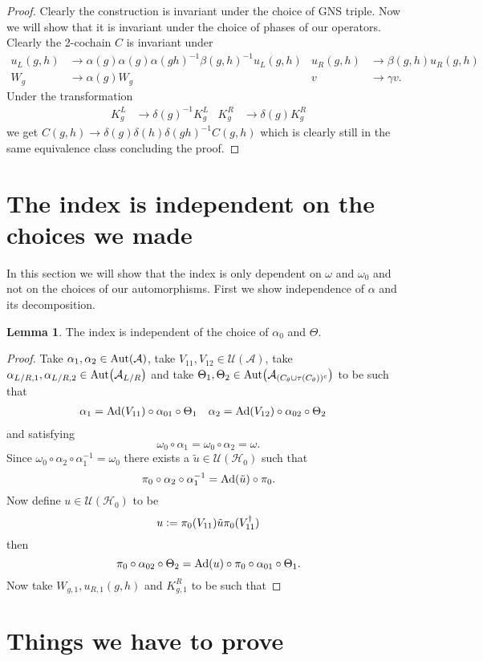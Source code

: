 \documentclass[12pt,a4paper,twoside]{article}
\newcommand{\defeq}{\vcentcolon=}
\let\originalleft\left
\let\originalright\right
\renewcommand{\left}{\mathopen{}\mathclose\bgroup\originalleft}
\renewcommand{\right}{\aftergroup\egroup\originalright}
\newcommand{\UU}{\mathcal U}
\newcommand{\HH}{\mathcal H}
\renewcommand{\AA}{\mathcal A}
\newcommand{\Ad}[1]{\textrm{Ad}\left(#1\right)}
\newcommand{\Aut}[1]{\textrm{Aut}\left(#1\right)}
\theoremstyle{definition}
\newtheorem{lemma}[theorem]{Lemma}
\numberwithin{equation}{section}
\begin{document}
\begin{proof}
	Clearly the construction is invariant under the choice of GNS triple. Now we will show that it is invariant under the choice of phases of our operators. Clearly the 2-cochain $C$ is invariant under
	\begin{align}
		u_L(g,h)&\rightarrow \alpha(g)\alpha(g)\alpha(gh)^{-1}\beta(g,h)^{-1} u_L(g,h)&u_R(g,h)&\rightarrow \beta(g,h)u_R(g,h)\\
		W_g&\rightarrow\alpha(g)W_g&v&\rightarrow \gamma v.
	\end{align}
	Under the transformation
	\begin{align}
		K_g^L&\rightarrow \delta(g)^{-1}K_g^L&K_g^R&\rightarrow \delta(g)K_g^R
	\end{align}
	we get $C(g,h)\rightarrow \delta(g)\delta(h)\delta(gh)^{-1}C(g,h)$ which is clearly still in the same equivalence class concluding the proof.
\end{proof}
\section{The index is independent on the choices we made}
In this section we will show that the index is only dependent on $\omega$ and $\omega_0$ and not on the choices of our automorphisms. First we show independence of $\alpha$ and its decomposition.
\begin{lemma}
	The index is independent of the choice of $\alpha_0$ and $\Theta$.
\end{lemma}
\begin{proof}
	Take $\alpha_1,\alpha_2\in\Aut{\AA}$, take $V_{11},V_{12}\in\UU(\AA)$, take $\alpha_{L/R,1},\alpha_{L/R,2}\in\Aut{\AA_{L/R}}$ and take $\Theta_1,\Theta_2\in \Aut{\AA_{(C_\theta\cup \tau(C_\theta))^c}}$ to be such that
	\begin{align}
		\alpha_1&=\Ad{V_{11}}\circ\alpha_{01}\circ\Theta_1&\alpha_2&=\Ad{V_{12}}\circ\alpha_{02}\circ \Theta_2
	\end{align}
	and satisfying
	\begin{equation}
		\omega_0\circ\alpha_1=\omega_0\circ\alpha_2=\omega.
	\end{equation}
	Since $\omega_0\circ\alpha_2\circ\alpha_1^{-1}=\omega_0$ there exists a $\tilde{u}\in\UU(\HH_0)$ such that
	\begin{equation}
		\pi_0\circ\alpha_2\circ\alpha_1^{-1}=\Ad{\tilde{u}}\circ\pi_0.
	\end{equation}
	Now define $u\in\UU(\HH_0)$ to be
	\begin{equation}
		u\defeq \pi_0(V_{11})\tilde{u} \pi_0(V_{11}^\dagger)
	\end{equation}
	then
	\begin{equation}
		\pi_0\circ\alpha_{02}\circ\Theta_2=\Ad{u}\circ\pi_0\circ\alpha_{01}\circ\Theta_1.
	\end{equation}
	Now take $W_{g,1},u_{R,1}(g,h)$ and $K^R_{g,1}$ to be such that
\end{proof}
\section{Things we have to prove}



\end{document}
